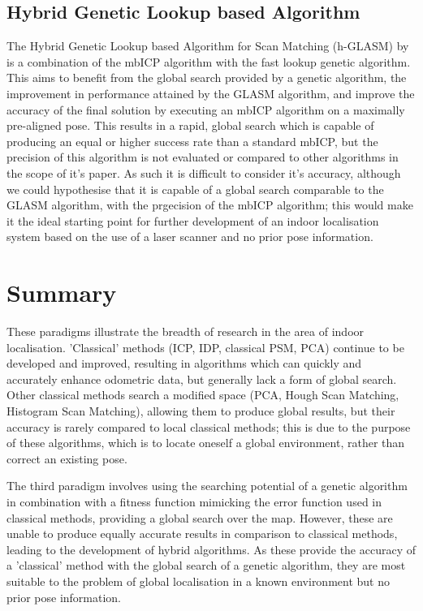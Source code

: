 \documentclass[authoryearcitations]{UoYCSproject}
\begin{document}
\subsection{Hybrid Genetic Lookup based Algorithm}
The Hybrid Genetic Lookup based Algorithm for Scan Matching (h-GLASM) by \citet{Lenac2011-co} is a combination of the mbICP algorithm with the fast lookup genetic algorithm. This aims to benefit from the global search provided by a genetic algorithm, the improvement in performance attained by the GLASM algorithm, and improve the accuracy of the final solution by executing an mbICP algorithm on a maximally pre-aligned pose. This results in a rapid, global search which is capable of producing an equal or higher success rate than a standard mbICP, but the precision of this algorithm is not evaluated or compared to other algorithms in the scope of it's paper. As such it is difficult to consider it's accuracy, although we could hypothesise that it is capable of a global search comparable to the GLASM algorithm, with the prgecision of the mbICP algorithm; this would make it the ideal starting point for further development of an indoor localisation system based on the use of a laser scanner and no prior pose information.

\section{Summary}
These paradigms illustrate the breadth of research in the area of indoor localisation. ’Classical’ methods (ICP, IDP, classical PSM, PCA) continue to be developed and improved, resulting in algorithms which can quickly and accurately enhance odometric data, but generally lack a form of global search. Other classical methods search a modified space (PCA, Hough Scan Matching, Histogram Scan Matching), allowing them to produce global results, but their accuracy is rarely compared to local classical methods; this is due to the purpose of these algorithms, which is to locate oneself a global environment, rather than correct an existing pose.

The third paradigm involves using the searching potential of a genetic algorithm in combination with a fitness function mimicking the error function used in classical methods, providing a global search over the map. However, these are unable to produce equally accurate results in comparison to classical methods, leading to the development of hybrid algorithms. As these provide the accuracy of a ’classical’ method with the global search of a genetic algorithm, they are most suitable to the problem of global localisation in a known environment but no prior pose information.
\end{document}
